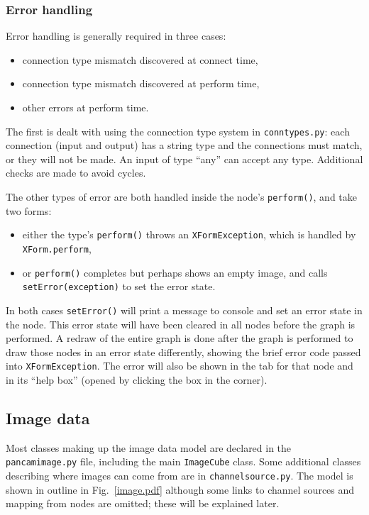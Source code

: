 \subsubsection{Error handling}
\label{errorhandling}
Error handling is generally required in three cases:
\begin{itemize}
\item connection type mismatch discovered at connect time,
\item connection type mismatch discovered at perform time,
\item other errors at perform time.
\end{itemize}
The first is dealt with using the connection type system
in \texttt{conntypes.py}: each connection (input and output) has a string
type and the connections must match, or they will not be made. An input
of type ``any'' can accept any type. Additional checks are made to avoid
cycles.

The other types of error are both handled inside the node's \texttt{perform()},
and take two forms:
\begin{itemize}
\item either the type's \texttt{perform()} throws an \texttt{XFormException}, which
is handled by \texttt{XForm.perform},
\item or \texttt{perform()} completes but perhaps shows an empty image,
and calls \texttt{setError(exception)} to set the error state.
\end{itemize}
In both cases \texttt{setError()} will print a message to console and
set an error state in the node. This error state
will have been cleared in all nodes before the graph is performed. A redraw of the
entire graph is done after the graph is performed to
draw those nodes in an error state differently, showing the 
brief error code passed into \texttt{XFormException}. The error
will also be shown in the tab for that node and in its ``help box''
(opened by clicking the box in the corner).

\subsection{Image data}
Most classes making up the image data 
model are declared in the \texttt{pancamimage.py} file, including the main \texttt{ImageCube}
class. Some additional classes describing where images can come from are in \texttt{channelsource.py}.
The model is shown in outline in Fig.~\ref{image.pdf} although some links to channel sources
and mapping from nodes are omitted; these will be explained later.

